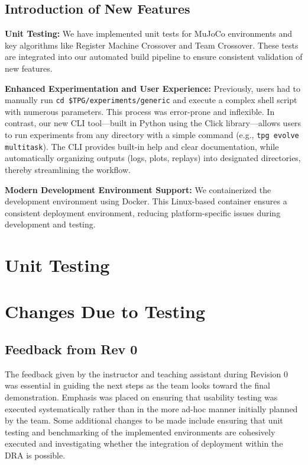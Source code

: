 \documentclass[12pt, titlepage]{article}
\begin{document}
\subsection{Introduction of New Features}

\textbf{Unit Testing:}  
We have implemented unit tests for MuJoCo environments and key algorithms like Register Machine Crossover and Team Crossover. These tests are integrated into our automated build pipeline to ensure consistent validation of new features.

\medskip
\textbf{Enhanced Experimentation and User Experience:}  
Previously, users had to manually run \texttt{cd \$TPG/experiments/generic} and execute a complex shell script with numerous parameters. This process was error-prone and inflexible. In contrast, our new CLI tool---built in Python using the Click library---allows users to run experiments from any directory with a simple command (e.g., \texttt{tpg evolve multitask}). The CLI provides built-in help and clear documentation, while automatically organizing outputs (logs, plots, replays) into designated directories, thereby streamlining the workflow.

\medskip
\textbf{Modern Development Environment Support:}  
We containerized the development environment using Docker. This Linux-based container ensures a consistent deployment environment, reducing platform-specific issues during development and testing.

\section{Unit Testing}

\section{Changes Due to Testing}

\subsection{Feedback from Rev 0}
The feedback given by the instructor and teaching assistant during Revision 0 was essential in guiding the next steps as the team looks toward the final demonstration.
Emphasis was placed on ensuring that usability testing was executed systematically rather than in the more ad-hoc manner initially planned by the team.
Some additional changes to be made include ensuring that unit testing and benchmarking of the implemented environments are cohesively executed and investigating whether the integration of deployment within the DRA is possible.
\end{document}
